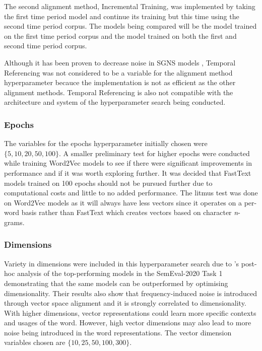 The second alignment method, Incremental Training, was implemented by taking the first time period model and continue its training but this time using the second time period corpus. The models being compared will be the model trained on the first time period corpus and the model trained on both the first and second time period corpus.

Although it has been proven to decrease noise in SGNS models \citep{dubossarsky-etal-2019-time}, Temporal Referencing was not considered to be a variable for the alignment method hyperparameter becauce the implementation is not as efficient as the other alignment methods. Temporal Referencing is also not compatible with the architecture and system of the hyperparameter search being conducted. 


\subsubsection{Epochs} 
\label{exp-epochs}

The variables for the epochs hyperparameter initially chosen were $\{5, 10, 20, 50, 100\}$. A smaller preliminary test for higher epochs were conducted while training Word2Vec models to see if there were significant improvements in performance and if it was worth exploring further. It was decided that FastText models trained on 100 epochs should not be pursued further due to computational costs and little to no added performance. The litmus test was done on Word2Vec models as it will always have less vectors since it operates on a per-word basis rather than FastText which creates vectors based on character \emph{n}-grams. 

\subsubsection{Dimensions}
Variety in dimensions were included in this hyperparameter search due to \citet{kaiser-etal-2020-ims}’s post-hoc analysis of the top-performing models in the SemEval-2020 Task 1 demonstrating that the same models can be outperformed by optimising dimensionality. Their results also show that frequency-induced noise is introduced through vector space alignment and it is strongly correlated to dimensionality. With higher dimensions, vector representations could learn more specific contexts and usages of the word. However, high vector dimensions may also lead to more noise being introduced in the word representations. The vector dimension variables chosen are $\{10, 25, 50, 100, 300\}$.

